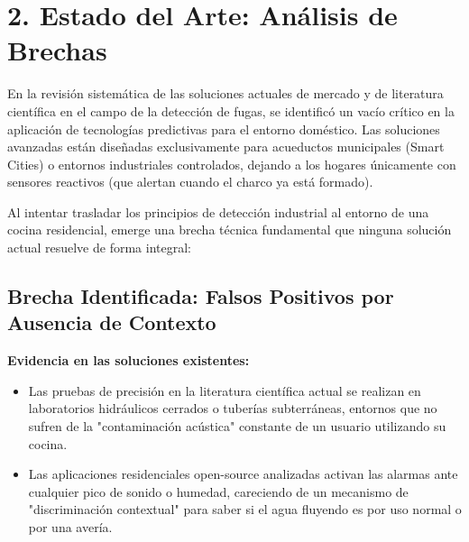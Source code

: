 \documentclass[11pt,a4paper]{article}
\begin{document}
\vspace{0.8cm}

\section*{2. Estado del Arte: Análisis de Brechas}

En la revisión sistemática de las soluciones actuales de mercado y de literatura científica en el campo de la detección de fugas, se identificó un vacío crítico en la aplicación de tecnologías predictivas para el entorno doméstico. Las soluciones avanzadas están diseñadas exclusivamente para acueductos municipales (Smart Cities) o entornos industriales controlados, dejando a los hogares únicamente con sensores reactivos (que alertan cuando el charco ya está formado).

Al intentar trasladar los principios de detección industrial al entorno de una cocina residencial, emerge una brecha técnica fundamental que ninguna solución actual resuelve de forma integral:

\subsection*{Brecha Identificada: Falsos Positivos por Ausencia de Contexto}

\begin{center}
\end{center}

\vspace{0.3cm}
\noindent\textbf{Evidencia en las soluciones existentes:}
\begin{itemize}
    \item Las pruebas de precisión en la literatura científica actual se realizan en laboratorios hidráulicos cerrados o tuberías subterráneas, entornos que no sufren de la "contaminación acústica" constante de un usuario utilizando su cocina.
    \item Las aplicaciones residenciales open-source analizadas activan las alarmas ante cualquier pico de sonido o humedad, careciendo de un mecanismo de "discriminación contextual" para saber si el agua fluyendo es por uso normal o por una avería.
\end{itemize}
\end{document}
